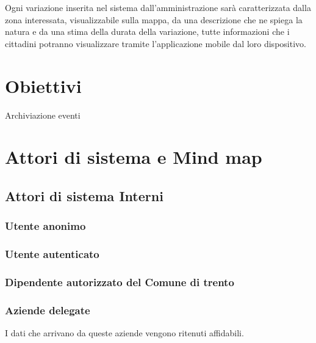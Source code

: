 \documentclass{article}
\begin{document}
Ogni variazione inserita nel sistema dall'amministrazione sarà caratterizzata dalla zona interessata, visualizzabile sulla mappa, da una descrizione che ne spiega la natura e da una stima della durata della variazione, tutte informazioni che i cittadini potranno visualizzare tramite l'applicazione mobile dal loro dispositivo.
\clearpage

\clearpage

\section{Obiettivi}

Archiviazione eventi\\


\clearpage

\section{Attori di sistema e Mind map}

\subsection{Attori di sistema Interni}

\subsubsection{Utente anonimo}

\subsubsection{Utente autenticato}

\subsubsection{Dipendente autorizzato del Comune di trento}

\subsubsection{Aziende delegate}
I dati che arrivano da queste aziende vengono ritenuti affidabili.
\end{document}
